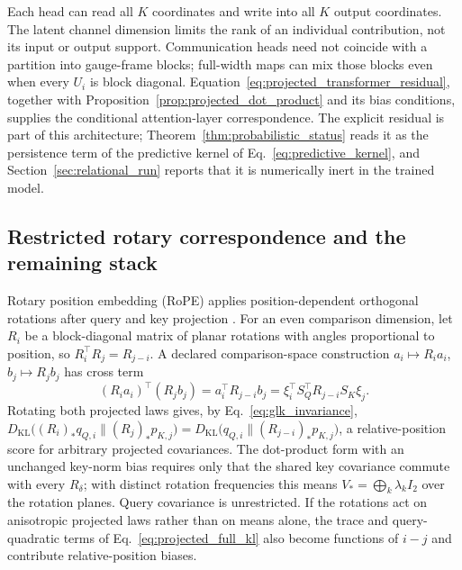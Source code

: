 \documentclass[twoside,11pt]{article}
\begin{document}
Each head can read all $K$ coordinates and write into all $K$ output coordinates. The latent channel dimension limits the rank of an individual contribution, not its input or output support. Communication heads need not coincide with a partition into gauge-frame blocks; full-width maps can mix those blocks even when every $U_i$ is block diagonal. Equation~\eqref{eq:projected_transformer_residual}, together with Proposition~\ref{prop:projected_dot_product} and its bias conditions, supplies the conditional attention-layer correspondence. The explicit residual is part of this architecture; Theorem~\ref{thm:probabilistic_status} reads it as the persistence term of the predictive kernel of Eq.~\eqref{eq:predictive_kernel}, and Section~\ref{sec:relational_run} reports that it is numerically inert in the trained model.

\subsection{Restricted rotary correspondence and the remaining stack}
\label{sec:rope}

Rotary position embedding (RoPE) applies position-dependent orthogonal rotations after query and key projection \citep{su2024roformer}. For an even comparison dimension, let $R_i$ be a block-diagonal matrix of planar rotations with angles proportional to position, so $R_i^\top R_j=R_{j-i}$. A declared comparison-space construction $a_i\mapsto R_i a_i$, $b_j\mapsto R_jb_j$ has cross term
\begin{equation}
(R_i a_i)^\top(R_jb_j)
=a_i^\top R_{j-i}b_j
=\xi_i^\top S_Q^\top R_{j-i}S_K\xi_j.
\label{eq:projected_rope_kernel}
\end{equation}
Rotating both projected laws gives, by Eq.~\eqref{eq:glk_invariance}, $D_{\mathrm{KL}}\bigl((R_i)_*q_{Q,i}\|(R_j)_*p_{K,j}\bigr)=D_{\mathrm{KL}}\bigl(q_{Q,i}\|(R_{j-i})_*p_{K,j}\bigr)$, a relative-position score for arbitrary projected covariances. The dot-product form with an unchanged key-norm bias requires only that the shared key covariance commute with every $R_\delta$; with distinct rotation frequencies this means $V_*=\bigoplus_k\lambda_kI_2$ over the rotation planes. Query covariance is unrestricted. If the rotations act on anisotropic projected laws rather than on means alone, the trace and query-quadratic terms of Eq.~\eqref{eq:projected_full_kl} also become functions of $i-j$ and contribute relative-position biases.
\end{document}
